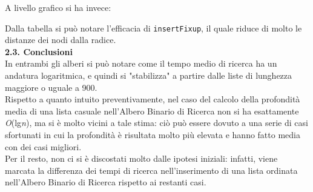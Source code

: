 \documentclass[]{article}
\begin{document}
\newpage
A livello grafico si ha invece:
\begin{center}
\end{center}

Dalla tabella si può notare l'efficacia di \texttt{insertFixup}, il quale riduce di molto le distanze dei nodi dalla radice.\\

{\large \textbf{{\Large{2}}.{\small{3}}. Conclusioni}}\\
In entrambi gli alberi si può notare come il tempo medio di ricerca ha un andatura logaritmica, 
e quindi si "stabilizza" a partire dalle liste di lunghezza maggiore o uguale a 900.\\
Rispetto a quanto intuito preventivamente, nel caso del calcolo della profondità media di una lista casuale nell'Albero Binario di Ricerca non si ha esattamente 
\textit{O}(lg\textit{n}), ma si è molto vicini a tale stima: ciò può essere dovuto a una serie di casi sfortunati in cui la profondità è risultata molto più elevata e 
hanno fatto media con dei casi migliori.\\
Per il resto, non ci si è discostati molto dalle ipotesi iniziali: 
infatti, viene marcata la differenza dei tempi di ricerca nell'inserimento di una lista ordinata nell'Albero Binario di Ricerca rispetto ai restanti casi.
\end{document}
